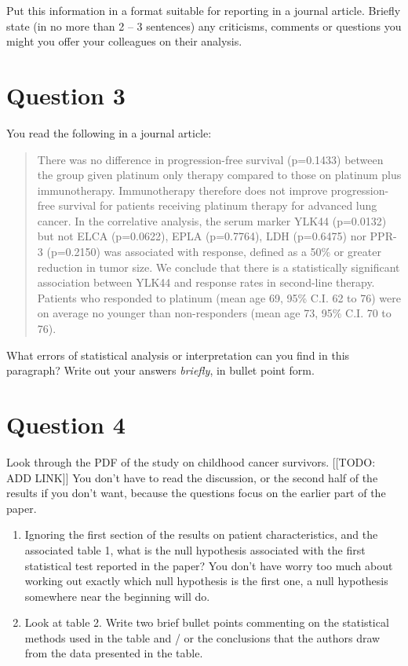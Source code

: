 \documentclass[]{book}
\begin{document}
Put this information in a format suitable for reporting in a journal article. Briefly state (in no more than 2 -- 3 sentences) any criticisms, comments or questions you might you offer your colleagues on their analysis.

\hypertarget{question-3}{%
\section{Question 3}\label{question-3}}

You read the following in a journal article:

\begin{quote}
There was no difference in progression-free survival (p=0.1433) between the group given platinum only therapy compared to those on platinum plus immunotherapy. Immunotherapy therefore does not improve progression-free survival for patients receiving platinum therapy for advanced lung cancer. In the correlative analysis, the serum marker YLK44 (p=0.0132) but not ELCA (p=0.0622), EPLA (p=0.7764), LDH (p=0.6475) nor PPR-3 (p=0.2150) was associated with response, defined as a 50\% or greater reduction in tumor size. We conclude that there is a statistically significant association between YLK44 and response rates in second-line therapy. Patients who responded to platinum (mean age 69, 95\% C.I. 62 to 76) were on average no younger than non-responders (mean age 73, 95\% C.I. 70 to 76).
\end{quote}

What errors of statistical analysis or interpretation can you find in this paragraph? Write out your answers \emph{briefly}, in bullet point form.

\hypertarget{question-4}{%
\section{Question 4}\label{question-4}}

Look through the PDF of the study on childhood cancer survivors. {[}{[}TODO: ADD LINK{]}{]} You don't have to read the discussion, or the second half of the results if you don't want, because the questions focus on the earlier part of the paper.

\begin{enumerate}
\def\labelenumi{\alph{enumi})}
\item
  Ignoring the first section of the results on patient characteristics, and the associated table 1, what is the null hypothesis associated with the first statistical test reported in the paper? You don't have worry too much about working out exactly which null hypothesis is the first one, a null hypothesis somewhere near the beginning will do.
\item
  Look at table 2. Write two brief bullet points commenting on the statistical methods used in the table and / or the conclusions that the authors draw from the data presented in the table.
\end{enumerate}
\end{document}
